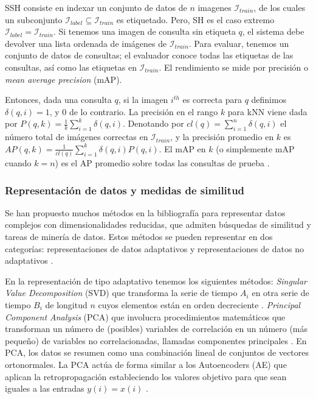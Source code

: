 SSH consiste en indexar un conjunto de datos de $ n $ imagenes $ \mathcal{I}_{train} $, de los cuales un subconjunto $ \mathcal{I}_{label} \subseteq \mathcal{I}_{train} $ es etiquetado. Pero, SH es el caso extremo $ \mathcal{I}_{label} = \mathcal{I}_{train} $. Si tenemos una imagen de consulta sin etiqueta $ q $, el sistema debe devolver una lista ordenada de imágenes de $ \mathcal{I}_{train} $. Para evaluar, tenemos un conjunto de datos de consultas; el evaluador conoce todas las etiquetas de las consultas, así como las etiquetas en $ \mathcal{I}_{train} $. El rendimiento se mide por precisión o \textit{mean average precision} (mAP).

Entonces, dada una consulta $ q $, si la imagen $ i^{th} $ es correcta para $ q $ definimos $ \delta(q, i) = 1 $, y $ 0 $ de lo contrario. La precisión en el rango $ k $ para kNN viene dada por $ P(q, k) = \tfrac{1}{k} {\sum}_{i = 1}^{k} \delta(q, i) $. Denotando por $ cl(q) = {\sum}_{i = 1}^{n} \delta(q, i) $ el número total de imágenes correctas en $ \mathcal{I}_{train} $, y la precisión promedio en $ k $ es $ AP(q, k) = \tfrac{1}{cl(q)} {\sum}_{i = 1}^{k} \delta(q, i) P( q, i) $. El mAP en $ k $ (o simplemente mAP cuando $ k = n $) es el AP promedio sobre todas las consultas de prueba \cite{sablayrolles2016should}.

\subsubsection{Representación de datos y medidas de similitud}\label{sec:methods_reduce}

Se han propuesto muchos métodos en la bibliografía para representar datos complejos con dimensionalidades reducidas, que admiten búsquedas de similitud y tareas de minería de datos. Estos métodos se pueden representar en dos categorías: representaciones de datos adaptativos y representaciones de datos no adaptativos \cite{wang13}.

En la representación de  tipo adaptativo   tenemos los siguientes métodos: \textit{Singular Value Decomposition} (SVD) que transforma la serie de tiempo $ A_i $ en otra serie de tiempo $ B_i $ de longitud $ n $ cuyos elementos están en orden decreciente \cite{Bettaiah14}. \textit{Principal Component Analysis} (PCA) que involucra procedimientos matemáticos que transforman un número de (posibles) variables de correlación en un número (más pequeño) de variables no correlacionadas, llamadas componentes principales \cite{wekwek}. En PCA, los datos se resumen como una combinación lineal de conjuntos de vectores ortonormales. La PCA actúa de forma similar a los Autoencoders (AE) que aplican la retropropagación estableciendo los valores objetivo para que sean iguales a las entradas $ y(i) = x(i) $ \cite{wekwek}.

